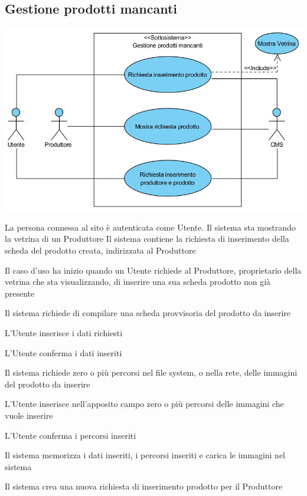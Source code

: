 \subsection{Gestione prodotti mancanti}
\begin{center}
   \includegraphics[width=\textwidth]{assets/visualParadigm/cu/GestioneProdottiMancanti}
\end{center}
{}
{La persona connessa al sito è autenticata come Utente. Il sistema sta mostrando la vetrina di un Produttore}
{Il sistema contiene la richiesta di inserimento della scheda del prodotto creata, indirizzata al Produttore}
{\begin{enumCU}
		\item Il caso d'uso ha inizio quando un Utente richiede al Produttore, proprietario della vetrina che sta visualizzando, di inserire una sua scheda prodotto non già presente
		\item Il sistema richiede di compilare una scheda provvisoria del prodotto da inserire
		\item L'Utente inserisce i dati richiesti\label{curicinsimmpro:1}
		\item L'Utente conferma i dati inseriti 
		\item Il sistema richiede zero o più percorsi nel file system, o nella rete, delle immagini del prodotto da inserire
		\item L'Utente inserisce nell'apposito campo zero o più percorsi delle immagini che vuole inserire\label{curicinsimmpro:2}
		\item L'Utente conferma i percorsi inseriti\label{curicinsimmpro:3}
		\item Il sistema memorizza i dati inseriti, i percorsi inseriti e carica le immagini nel sistema
		\item Il sistema crea una nuova richiesta di inserimento prodotto per il Produttore
	\end{enumCU}}
